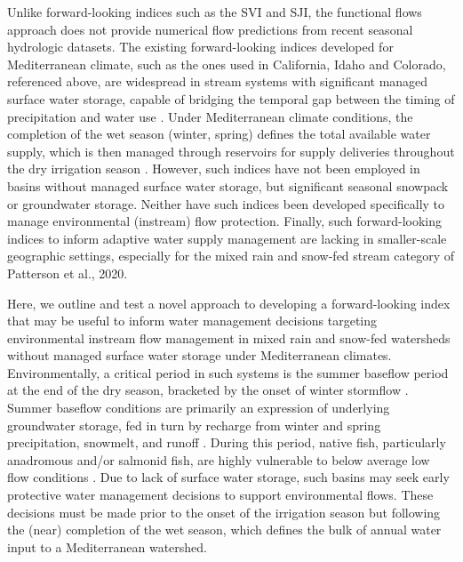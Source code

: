 \documentclass[hess, manuscript]{copernicus}
\begin{document}
Unlike forward-looking indices such as the SVI and SJI, the functional
flows approach \citep[e.g.][]{Yarnell2020} does not provide numerical
flow predictions from recent seasonal hydrologic datasets. The existing
forward-looking indices developed for Mediterranean climate, such as the
ones used in California, Idaho and Colorado, referenced above, are
widespread in stream systems with significant managed surface water
storage, capable of bridging the temporal gap between the timing of
precipitation and water use \citep[e.g.,][]{DWR2023}. Under
Mediterranean climate conditions, the completion of the wet season
(winter, spring) defines the total available water supply, which is then
managed through reservoirs for supply deliveries throughout the dry
irrigation season \citep[summer and fall, e.g.,][]{ColoradoDWR2023}. However, such indices have not been employed
in basins without managed surface water storage, but significant
seasonal snowpack or groundwater storage. Neither have such indices been
developed specifically to manage environmental (instream) flow
protection. Finally, such forward-looking indices to inform adaptive
water supply management are lacking in smaller-scale geographic
settings, especially for the mixed rain and snow-fed stream category of
Patterson et al., 2020.

Here, we outline and test a novel approach to developing a
forward-looking index that may be useful to inform water management
decisions targeting environmental instream flow management in mixed rain
and snow-fed watersheds without managed surface water storage under
Mediterranean climates. Environmentally, a critical period in such
systems is the summer baseflow period at the end of the dry season,
bracketed by the onset of winter stormflow \citep{Peek2022}. Summer
baseflow conditions are primarily an expression of underlying
groundwater storage, fed in turn by recharge from winter and spring
precipitation, snowmelt, and runoff \citep{Tarboton2003}. During this
period, native fish, particularly anadromous and/or salmonid fish, are
highly vulnerable to below average low flow conditions
\citep[e.g.,][]{VanKirk2008a}. Due to lack of surface water storage,
such basins may seek early protective water management decisions to
support environmental flows. These decisions must be made prior to the
onset of the irrigation season but following the (near) completion of
the wet season, which defines the bulk of annual water input to a
Mediterranean watershed.
\end{document}
